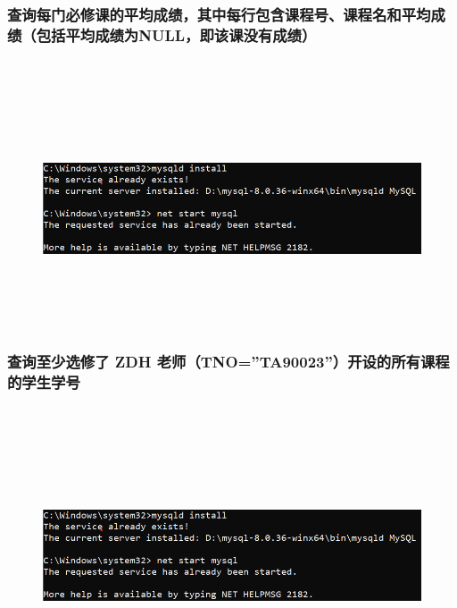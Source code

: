 \documentclass{ctexart}
\begin{document}
\subsubsection{查询每门必修课的平均成绩，其中每行包含课程号、课程名和平均成绩（包括平均成绩为NULL，即该课没有成绩）}
\begin{lstlisting}[language=sql]
	
\end{lstlisting}
\begin{figure}[H]
	\centering 
	\includegraphics[height=7cm,width=14cm]{1.png}
	\end{figure}
\subsubsection{查询至少选修了 ZDH 老师（TNO=”TA90023”）开设的所有课程的学生学号}
\begin{lstlisting}[language=sql]
	
\end{lstlisting}
\begin{figure}[H]
	\centering 
	\includegraphics[height=7cm,width=14cm]{1.png}
	\end{figure}
\end{document}
